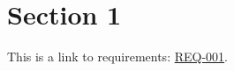 \documentclass[a4paper]{article}
\begin{document}
\newpage
\newpage
\section{Section 1}
This is a link to requirements: \href{http://xxx}{REQ-001}.
\end{document}
